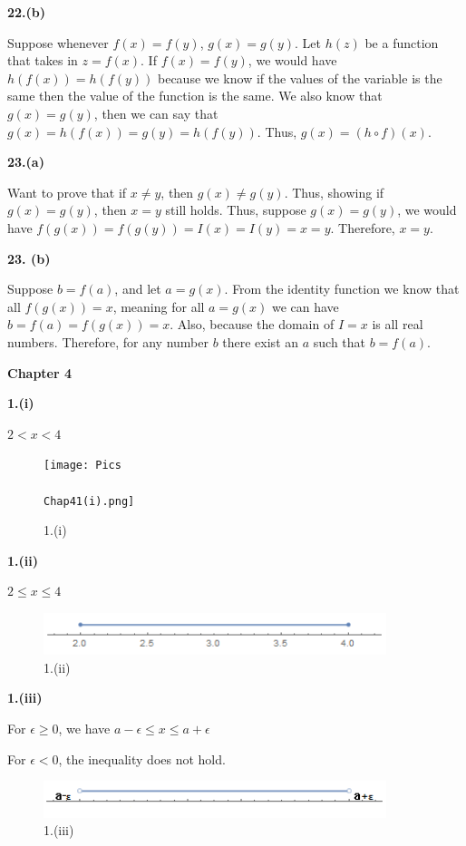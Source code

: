 \documentclass[a4paper,12pt]{report}
\begin{document}
\noindent
\textbf{22.(b)}

\noindent
Suppose whenever $f(x)=f(y)$, $g(x)=g(y)$. Let $h(z)$ be a function that takes in $z=f(x)$. If $f(x)=f(y)$, we would have $h(f(x))=h(f(y))$ because we know if the values of the variable is the same then the value of the function is the same. We also know that $g(x)=g(y)$, then we can say that $g(x)=h(f(x))=g(y)=h(f(y))$. Thus, $g(x)=(h\circ f)(x)$. 

\noindent
\textbf{23.(a)}

\noindent
Want to prove that if $x\neq y$, then $g(x)\neq g(y)$. Thus, showing if $g(x)=g(y)$, then $x=y$ still holds. Thus, suppose $g(x)=g(y)$, we would have $f(g(x))=f(g(y))=I(x)=I(y)=x=y$. Therefore, $x=y$.

\noindent
\textbf{23. (b)}

\noindent
Suppose $b=f(a)$, and let $a=g(x)$. From the identity function we know that all $f(g(x))=x$, meaning for all $a=g(x)$ we can have $b=f(a)=f(g(x))=x$. Also, because the domain of $I=x$ is all real numbers. Therefore, for any number $b$ there exist an $a$ such that $b=f(a)$.

\pagebreak
\noindent
\textbf{Chapter 4}

\noindent
\textbf{1.(i)}

\noindent
$2<x<4$

\begin{figure}[h]
  \centering
  \texttt{[image: Pics\\\\Chap41(i).png]}
  \caption{1.(i)}
\end{figure}

\noindent
\textbf{1.(ii)}

\noindent
$2\leq x\leq4$

\begin{figure}[h]
  \centering
  \includegraphics[width=10cm]{./Pics/Chap41(ii).png}
  \caption{1.(ii)}
\end{figure}

\noindent
\textbf{1.(iii)}

\noindent
For $\epsilon \geq 0$, we have $a-\epsilon \leq x \leq a+\epsilon$

\noindent
For $\epsilon < 0$, the inequality does not hold. 

\begin{figure}[h]
  \centering
  \includegraphics[width=10cm]{Pics/Chap41(iii).png}
  \caption{1.(iii)}
\end{figure}
\end{document}
